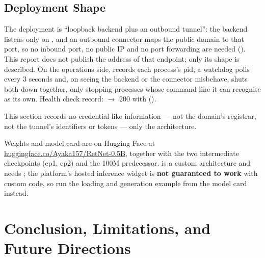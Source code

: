 \documentclass[11pt,openany]{article}
\begin{document}
\subsection{Deployment Shape}

The deployment is ``loopback backend plus an outbound tunnel'': the backend listens only on
\linebreak[0], and an outbound connector maps the public domain to that port, so no
inbound port, no public IP and no port forwarding are needed (\linebreak[0]). This
report does not publish the address of that endpoint; only its shape is described. On the
operations side, \linebreak[0] records each process's pid, a watchdog polls every
3 seconds and, on seeing the backend or the connector misbehave, shuts both down together, only
stopping processes whose command line it can recognise as its own. Health check record:
\linebreak[0] $\rightarrow$ 200 with
\linebreak[0]\linebreak[0]\linebreak[0]\linebreak[0] (\linebreak[0]).

This section records no credential-like information --- not the domain's registrar, not the
tunnel's identifiers or tokens --- only the architecture.

Weights and model card are on Hugging Face at
\href{https://huggingface.co/Ayaka157/RetNet-0.5B}{huggingface.co/Ayaka157/RetNet-0.5B}, together
with the two intermediate checkpoints (ep1, ep2) and the 100M predecessor. \linebreak[0]
is a custom architecture and needs \linebreak[0]\linebreak[0]; the platform's hosted inference
widget is \textbf{not guaranteed to work} with custom code, so run the loading and generation
example from the model card instead.

\section{Conclusion, Limitations, and Future Directions}
\end{document}
